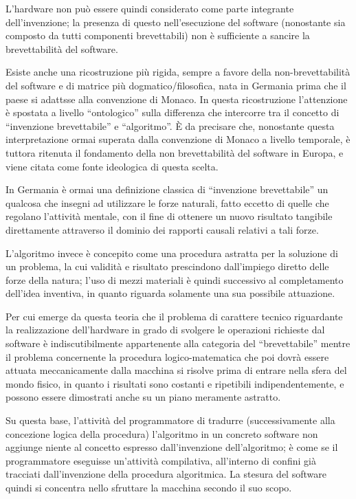 L'hardware non può essere quindi considerato come parte integrante dell'invenzione; la presenza di questo nell'esecuzione del software (nonostante sia composto da tutti componenti brevettabili) non è sufficiente a sancire la brevettabilità del software.

Esiste anche una ricostruzione più rigida, sempre a favore della non-brevettabilità del software e di matrice più dogmatico/filosofica, nata in Germania prima che il paese si adattsse alla convenzione di Monaco. In questa ricostruzione l'attenzione è spostata a livello ``ontologico'' sulla differenza che intercorre tra il concetto di ``invenzione brevettabile'' e ``algoritmo''. \`E da precisare che, nonostante questa interpretazione ormai superata dalla convenzione di Monaco a livello temporale, è tuttora ritenuta il fondamento della non brevettabilità del software in Europa, e viene citata come fonte ideologica di questa scelta.

In Germania è ormai una definizione classica di ``invenzione brevettabile'' un qualcosa che insegni ad utilizzare le forze naturali, fatto eccetto di quelle che regolano l'attività mentale, con il fine di ottenere un nuovo risultato tangibile direttamente attraverso il dominio dei rapporti causali relativi a tali forze.

L'algoritmo invece è concepito come una procedura astratta per la soluzione di un problema, la cui validità e risultato prescindono dall'impiego diretto delle forze della natura; l'uso di mezzi materiali è quindi successivo al completamento dell'idea inventiva, in quanto riguarda solamente una sua possibile attuazione.

Per cui emerge da questa teoria che il problema di carattere tecnico riguardante la realizzazione dell'hardware in grado di svolgere le operazioni richieste dal software è indiscutibilmente appartenente alla categoria del ``brevettabile'' mentre il problema concernente la procedura logico-matematica che poi dovrà essere attuata meccanicamente dalla macchina si risolve prima di entrare nella sfera del mondo fisico, in quanto i risultati sono costanti e ripetibili indipendentemente, e possono essere dimostrati anche su un piano meramente astratto.

Su questa base, l'attività del programmatore di tradurre (successivamente alla concezione logica della procedura) l'algoritmo in un concreto software non aggiunge niente al concetto espresso dall'invenzione dell'algoritmo; è come se il programmatore eseguisse un'attività compilativa, all'interno di confini già tracciati dall'invenzione della procedura algoritmica. La stesura del software quindi si concentra nello sfruttare la macchina secondo il suo scopo.

